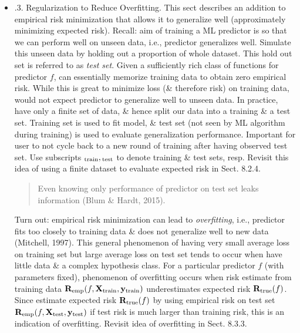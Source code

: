\documentclass{article}
\newtheorem{remark}{Remark}
\begin{document}
\begin{itemize}
\begin{itemize}
\begin{itemize}
			\begin{remark}
				Many ML tasks are specified with an associated performance measure, e.g., accuracy of prediction or root mean squared error. Performance measure could be more complex, be cost sensitive, \& capture details about particular application. In principle, design of loss function for empirical risk minimization should correspond directly to performance measure specified by ML task. In practice, there is often a mismatch between design of loss function \& performance measure. This could be due to issues e.g. ease of implementation or efficiency of optimization.
			\end{remark}
			\item {.3. Regularization to Reduce Overfitting.} This sect describes an addition to empirical risk minimization that allows it to generalize well (approximately minimizing expected risk). Recall: aim of training a ML predictor is so that we can perform well on unseen data, i.e., predictor generalizes well. Simulate this unseen data by holding out a proportion of whole dataset. This hold out set is referred to as {\it test set}. Given a sufficiently rich class of functions for predictor $f$, can essentially memorize training data to obtain zero empirical risk. While this is great to minimize loss (\& therefore risk) on training data, would not expect predictor to generalize well to unseen data. In practice, have only a finite set of data, \& hence split our data into a training \& a test set. Training set is used to fit model, \& test set (not seen by ML algorithm during training) is used to evaluate generalization performance. Important for user to not cycle back to a new round of training after having observed test set. Use subscripts ${}_{\rm train},{}_{\rm test}$ to denote training \& test sets, resp. Revisit this idea of using a finite dataset to evaluate expected risk in Sect. 8.2.4.
			\begin{quote}
				Even knowing only performance of predictor on test set leaks information (Blum \& Hardt, 2015).
			\end{quote}
			Turn out: empirical risk minimization can lead to {\it overfitting}, i.e., predictor fits too closely to training data \& does not generalize well to new data (Mitchell, 1997). This general phenomenon of having very small average loss on training set but large average loss on test set tends to occur when have little data \& a complex hypothesis class. For a particular predictor $f$ (with parameters fixed), phenomenon of overfitting occurs when risk estimate from training data ${\bf R}_{\rm emp}(f,{\bf X}_{\rm train},{\bf y}_{\rm train})$ underestimates expected risk ${\bf R}_{\rm true}(f)$. Since estimate expected risk ${\bf R}_{\rm true}(f)$ by using empirical risk on test set ${\bf R}_{\rm emp}(f,{\bf X}_{\rm test},{\bf y}_{\rm test})$ if test risk is much larger than training risk, this is an indication of overfitting. Revisit idea of overfitting in Sect. 8.3.3.
			

\end{itemize}
\end{itemize}
\end{itemize}
\end{document}
